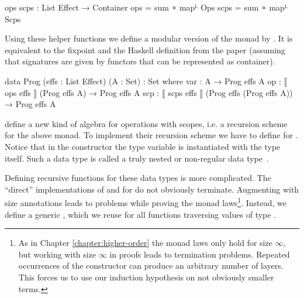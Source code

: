 \begin{code}
ops scps : List Effect → Container
ops   = sum ∘ mapᴸ Ops
scps  = sum ∘ mapᴸ Scps
\end{code}
Using these helper functions we define a modular version of the monad by
\textcite{DBLP:conf/lics/PirogSWJ18}.
It is equivalent to the fixpoint and the Haskell definition from the paper
(assuming that signatures are given by functors that can be represented as
container). %

\begin{code}
data Prog (effs : List Effect) (A : Set) : Set where
  var  :  A                                          → Prog effs A
  op   :  ⟦ ops   effs  ⟧ (Prog effs A)              → Prog effs A
  scp  :  ⟦ scps  effs  ⟧ (Prog effs (Prog effs A))  → Prog effs A
\end{code}
\textcite{DBLP:conf/lics/PirogSWJ18} define a new kind of algebra for operations
with scopes, i.e. a recursion scheme for the above monad.
To implement their recursion scheme we have to define \AgdaFunction{<\$>} for 
\AgdaSpace{}\AgdaSpace{}.
Notice that in the  constructor the type variable
 is instantiated with the type 
\AgdaSpace{}\AgdaSpace{}
itself.
Such a data type is called a truly nested or non-regular data
type~\cite{DBLP:conf/mpc/BirdM98}.

Defining recursive functions for these data types is more complicated.
The ``direct'' implementations of \AgdaFunction{<\$>} and \AgdaFunction{>>=} for
\AgdaSpace{}\AgdaSpace{}
do not obviously terminate.
Augmenting
\AgdaSpace{}\AgdaSpace{}
with size annotations leads to problems while
proving the monad laws\footnote{As in Chapter \ref{chapter:higher-order} the
  monad laws only hold for size $\infty$, but working with size $\infty$ in
  proofs leads to termination problems.
  Repeated occurrences of the  constructor can
  produce an arbitrary number of
  \AgdaSpace{} layers.
  This forces us to use our induction hypothesis on not obviously smaller
  terms.}.
Instead, we define a generic , which we reuse for all
functions traversing values of type
\AgdaSpace{}\AgdaSpace{}.


